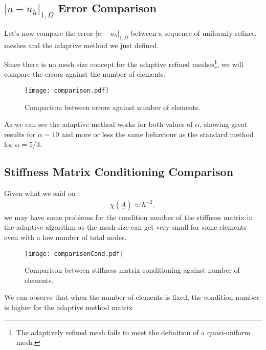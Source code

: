 \subsection[Error Comparison]{$|u - u_h|_{1, \Omega}$ Error Comparison}

Let's now compare the error $|u - u_h|_{1, \Omega}$ between a sequence of uniformly refined meshes and the adaptive method we just defined.

Since there is no mesh size concept for the adaptive refined meshes\footnote{The adaptively refined mesh fails to meet the definition of a quasi-uniform mesh.}, we will compare the errors against the number of elements.

\begin{figure}[!ht]
	\centering
	\texttt{[image: comparison.pdf]}
	\caption{Comparison between errors against number of elements.}
\end{figure}

As we can see the adaptive method works for both values of $\alpha$, showing great results for $\alpha = 10$ and more or less the same behaviour as the standard method for $\alpha = 5/3$.

\newpage
\begin{multicols}{2}
	
\end{multicols}

\newpage
\subsection{Stiffness Matrix Conditioning Comparison}

Given what we said on :
\begin{gather}
	\chi(\underline{\underline{A}}) \approx h^{-2},
\end{gather}
we may have some problems for the condition number of the stiffness matrix in the adaptive algorithm as the mesh size can get very small for some elements even with a low number of total nodes.

\begin{figure}[!ht]
	\centering
	\texttt{[image: comparisonCond.pdf]}
	\caption{Comparison between stiffness matrix conditioning against number of elements.}
\end{figure}

We can observe that when the number of elements is fixed, the condition number is higher for the adaptive method matrix 

\newpage
\begin{multicols}{2}
	
\end{multicols}